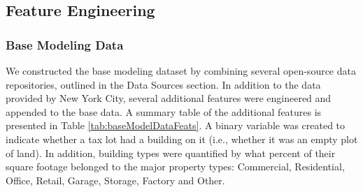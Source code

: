 \documentclass[12pt,]{article}
\begin{document}
\hypertarget{feature-engineering}{%
\subsection{Feature Engineering}\label{feature-engineering}}

\hypertarget{base-modeling-data}{%
\subsubsection{Base Modeling Data}\label{base-modeling-data}}

We constructed the base modeling dataset by combining several
open-source data repositories, outlined in the Data Sources section. In
addition to the data provided by New York City, several additional
features were engineered and appended to the base data. A summary table
of the additional features is presented in Table
\ref{tab:baseModelDataFeats}. A binary variable was created to indicate
whether a tax lot had a building on it (i.e., whether it was an empty
plot of land). In addition, building types were quantified by what
percent of their square footage belonged to the major property types:
Commercial, Residential, Office, Retail, Garage, Storage, Factory and
Other.
\end{document}
